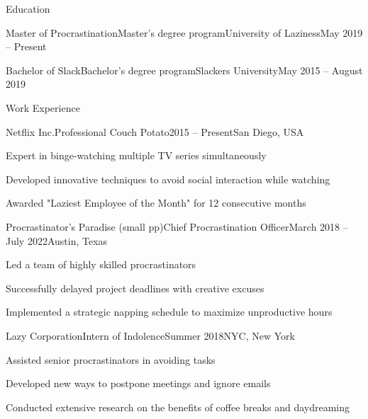 \documentclass[]{main}
\begin{document}
\resumeheader
{}
{}
{}
{}
{}
{}

\begin{section}{Education}
 \begin{subsectionnobullet}{Master of Procrastination}{Master's degree program}{University of Laziness}{May 2019 -- Present}
 \end{subsectionnobullet}

 \begin{subsectionnobullet}{Bachelor of Slack}{Bachelor's degree program}{Slackers University}{May 2015 -- August 2019}
 \end{subsectionnobullet}
\end{section}

\begin{section}{Work Experience}
 \begin{subsection}{Netflix Inc.}{Professional Couch Potato}{2015 -- Present}{San Diego, USA}
     \item Expert in binge-watching multiple TV series simultaneously
     \item Developed innovative techniques to avoid social interaction while watching
     \item Awarded "Laziest Employee of the Month" for 12 consecutive months
 \end{subsection}

 \begin{subsection}{Procrastinator's Paradise (small pp)}{Chief Procrastination Officer}{March 2018 -- July 2022}{Austin, Texas}
     \item Led a team of highly skilled procrastinators
     \item Successfully delayed project deadlines with creative excuses
     \item Implemented a strategic napping schedule to maximize unproductive hours
 \end{subsection}

 \begin{subsection}{Lazy Corporation}{Intern of Indolence}{Summer 2018}{NYC, New York}
     \item Assisted senior procrastinators in avoiding tasks
     \item Developed new ways to postpone meetings and ignore emails
     \item Conducted extensive research on the benefits of coffee breaks and daydreaming
 \end{subsection}

\end{section}
\end{document}
